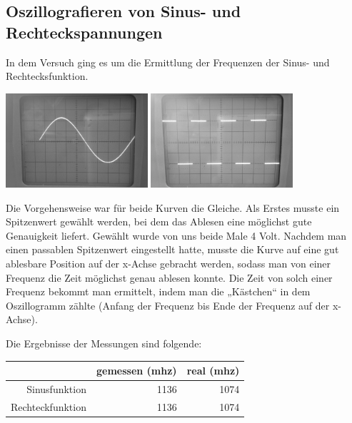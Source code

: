 \documentclass[a4paper,11pt]{article}
\begin{document}
\subsection{Oszillografieren von Sinus- und Rechteckspannungen}

In dem Versuch ging es um die Ermittlung der Frequenzen der Sinus- und Rechtecksfunktion.  

\begin{center}
  \includegraphics[height=35mm]{Sinus}
  \includegraphics[height=35mm]{Rechteck}
\end{center}

Die Vorgehensweise war für beide Kurven die Gleiche. Als Erstes musste ein Spitzenwert gewählt werden, bei dem das Ablesen eine möglichst gute Genauigkeit liefert. Gewählt wurde von uns beide Male 4 Volt. 
Nachdem man einen passablen Spitzenwert eingestellt hatte, musste die Kurve auf eine gut ablesbare Position auf der x-Achse gebracht werden, sodass man von einer Frequenz die Zeit möglichst genau ablesen konnte. 
Die Zeit von solch einer Frequenz bekommt man ermittelt, indem man die „Kästchen“ in dem Oszillogramm zählte (Anfang der Frequenz bis Ende der Frequenz auf der x-Achse). 

Die Ergebnisse der Messungen sind folgende:

\begin{center}
\begin{tabular}{r|r|r}
  &  gemessen (mhz) & real (mhz) \\
  \hline
  Sinusfunktion & 1136 & 1074 \\
  Rechteckfunktion & 1136 & 1074 \\
\end{tabular}
\end{center}
\end{document}
